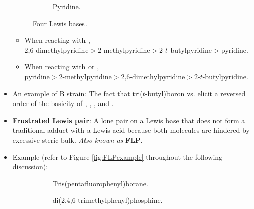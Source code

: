 \documentclass[../notes.tex]{subfiles}
\begin{document}
\begin{itemize}
\begin{figure}[h!]
        \begin{subfigure}[b]{0.15\linewidth}
            \centering
            \caption{Pyridine.}
            \label{fig:4Lewisbasesd}
        \end{subfigure}
        \caption{Four Lewis bases.}
        \label{fig:4Lewisbases}
    \end{figure}
    \begin{itemize}
        \item When reacting with , $\text{2,6-dimethylpyridine}>\text{2-methylpyridine}>\text{2-$t$-butylpyridine}>\text{pyridine}$.
        \item When reacting with  or , $\text{pyridine}>\text{2-methylpyridine}>\text{2,6-dimethylpyridine}>\text{2-$t$-butylpyridine}$.
    \end{itemize}
    \item An example of B strain: The fact that tri($t$-butyl)boron vs.  elicit a reversed order of the basicity of , , , and .
    \item \textbf{Frustrated Lewis pair}: A lone pair on a Lewis base that does not form a traditional adduct with a Lewis acid because both molecules are hindered by excessive steric bulk. \emph{Also known as} \textbf{FLP}.
    \item Example (refer to Figure \ref{fig:FLPexample} throughout the following discussion):
    \begin{figure}[h!]
        \centering
        \begin{subfigure}[b]{0.4\linewidth}
            \centering
            \caption{Tris(pentafluorophenyl)borane.}
            \label{fig:FLPexamplea}
        \end{subfigure}
        \begin{subfigure}[b]{0.4\linewidth}
            \centering
            \caption{di(2,4,6-trimethylphenyl)phosphine.}
            \label{fig:FLPexampleb}
        \end{subfigure}\\[1em]
        \begin{subfigure}[b]{0.49\linewidth}
            \centering

\end{subfigure}
\end{figure}
\end{itemize}
\end{document}
